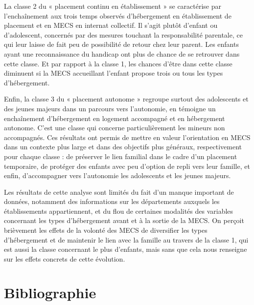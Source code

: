 \documentclass[
  12,
  a4paper,
]{report}
\begin{document}
La classe 2 du « placement continu en établissement » se caractérise par
l'enchaînement aux trois temps observés d'hébergement en établissement
de placement et en MECS en internat collectif. Il s'agit plutôt d'enfant
ou d'adolescent, concernés par des mesures touchant la responsabilité
parentale, ce qui leur laisse de fait peu de possibilité de retour chez
leur parent. Les enfants ayant une reconnaissance du handicap ont plus
de chance de se retrouver dans cette classe. Et par rapport à la classe
1, les chances d'être dans cette classe diminuent si la MECS accueillant
l'enfant propose trois ou tous les types d'hébergement.

Enfin, la classe 3 du « placement autonome » regroupe surtout des
adolescents et des jeunes majeurs dans un parcours vers l'autonomie, en
témoigne un enchaînement d'hébergement en logement accompagné et en
hébergement autonome. C'est une classe qui concerne particulièrement les
mineurs non accompagnés. Ces résultats ont permis de mettre en valeur
l'orientation en MECS dans un contexte plus large et dans des objectifs
plus généraux, respectivement pour chaque classe : de préserver le lien
familial dans le cadre d'un placement temporaire, de protéger des
enfants avec peu d'option de repli vers leur famille, et enfin,
d'accompagner vers l'autonomie les adolescents et les jeunes majeurs.

Les résultats de cette analyse sont limités du fait d'un manque
important de données, notamment des informations sur les départements
auxquels les établissements appartiennent, et du flou de certaines
modalités des variables concernant les types d'hébergement avant et à la
sortie de la MECS. On perçoit brièvement les effets de la volonté des
MECS de diversifier les types d'hébergement et de maintenir le lien avec
la famille au travers de la classe 1, qui est aussi la classe concernant
le plus d'enfants, mais sans que cela nous renseigne sur les effets
concrets de cette évolution.

\newpage
\singlespacing
\setlength{\parskip}{0.5em}

{}
\section*{Bibliographie}
\end{document}
